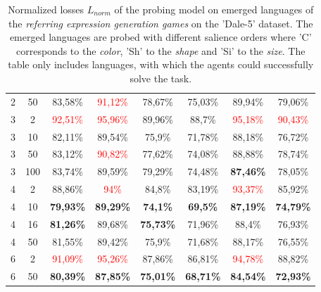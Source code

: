 \begin{table}[ht]
\begin{tabular}{cc|c|c|c|c|c|c}
        {2} & {50}  & {83,58\%}                & \textcolor{red}{91,12\%} & {78,67\%}                & {75,03\%}            & {89,94\%}                & {79,06\%}                \\
        {3} & {2}   & \textcolor{red}{92,51\%} & \textcolor{red}{95,96\%} & {89,96\%}                & {88,7\%}             & \textcolor{red}{95,18\%} & \textcolor{red}{90,43\%} \\
        {3} & {10}  & {82,11\%}                & {89,54\%}                & {75,9\%}                 & {71,78\%}            & {88,18\%}                & {76,72\%}                \\
        {3} & {50}  & {83,12\%}                & \textcolor{red}{90,82\%} & {77,62\%}                & {74,08\%}            & {88,88\%}                & {78,74\%}                \\
        {3} & {100} & {83,74\%}                & {89,59\%}                & {79,29\%}                & {74,48\%}            & \textbf{87,46\%}         & {78,05\%}                \\
        {4} & {2}   & {88,86\%}                & \textcolor{red}{94\%}    & {84,8\%}                 & {83,19\%}            & \textcolor{red}{93,37\%} & {85,92\%}                \\
        {4} & {10}  & \textbf{79,93\%}         & \textbf{89,29\%}         & \textbf{74,1\%}          & \textbf{69,5\%}      & \textbf{87,19\%}         & \textbf{74,79\%}         \\
        {4} & {16}  & \textbf{81,26\%}         & {89,68\%}                & \textbf{75,73\%}         & {71,96\%}            & {88,4\%}                 & {76,93\%}                \\
        {4} & {50}  & {81,55\%}                & {89,42\%}                & {75,9\%}                 & {71,68\%}            & {88,17\%}                & {76,55\%}                \\
        {6} & {2}   & \textcolor{red}{91,09\%} & \textcolor{red}{95,26\%} & {87,86\%}                & {86,81\%}            & \textcolor{red}{94,78\%} & {88,82\%}                \\
        {6} & {50}  & \textbf{80,39\%}         & \textbf{87,85\%}         & \textbf{75,01\%}         & \textbf{68,71\%}     & \textbf{84,54\%}         & \textbf{72,93\%}         \\
        \bottomrule
    \end{tabular}
    \caption{Normalized losses $L_{norm}$ of the probing model on emerged languages of the \emph{referring expression generation games} on the 'Dale-5' dataset. The emerged languages are probed with different salience orders where 'C' corresponds to the \emph{color}, 'Sh' to the \emph{shape} and 'Si' to the \emph{size}. The table only includes languages, with which the agents could successfully solve the task.}
    \label{tab:probing:re-generator:dale-5}
\end{table}


